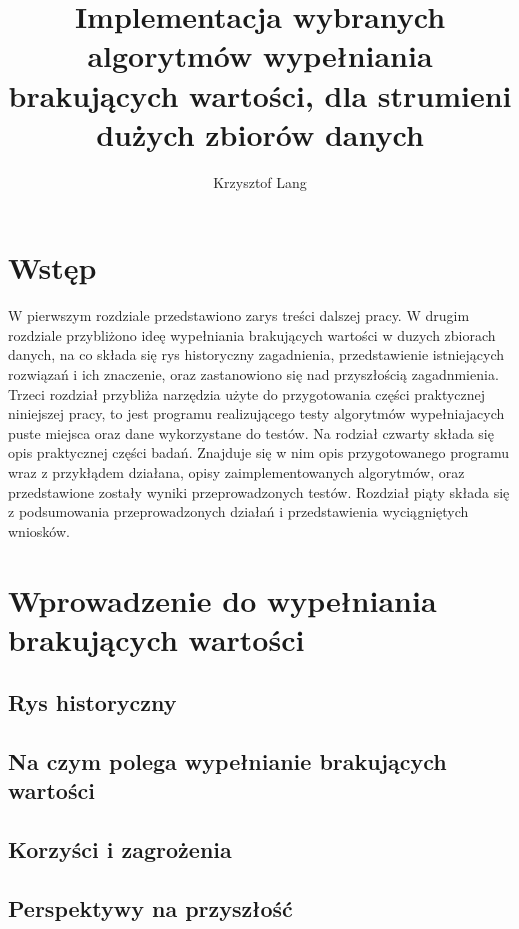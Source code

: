 \documentclass[12pt,twoside]{article}
\author{Krzysztof Lang}
\title{Implementacja wybranych algorytmów wypełniania brakujących wartości, dla strumieni dużych zbiorów danych}
\begin{document}
\maketitle

\blankpage

\tableofcontents
\clearpage
\blankpage


\section{Wstęp}

W pierwszym rozdziale przedstawiono zarys treści dalszej pracy.
W drugim rozdziale przybliżono ideę wypełniania brakujących wartości w duzych zbiorach danych,
na co składa się rys historyczny zagadnienia, przedstawienie istniejących rozwiązań i ich znaczenie,
oraz zastanowiono się nad przyszłością zagadnmienia.
Trzeci rozdział przybliża narzędzia użyte do przygotowania części praktycznej niniejszej pracy,
to jest programu realizującego testy algorytmów wypełniajacych puste miejsca oraz
dane wykorzystane do testów.
Na rodział czwarty składa się opis praktycznej części badań. 
Znajduje się w nim opis przygotowanego programu wraz z przykłądem działana, opisy zaimplementowanych algorytmów,
oraz przedstawione zostały wyniki przeprowadzonych testów.
Rozdział piąty składa się z podsumowania przeprowadzonych działań i przedstawienia wyciągniętych wniosków.

\clearpage


\section{Wprowadzenie do wypełniania brakujących wartości}

\subsection{Rys historyczny}
\subsection{Na czym polega wypełnianie brakujących wartości}
\subsection{Korzyści i zagrożenia}
\subsection{Perspektywy na przyszłość}
\clearpage
\end{document}
